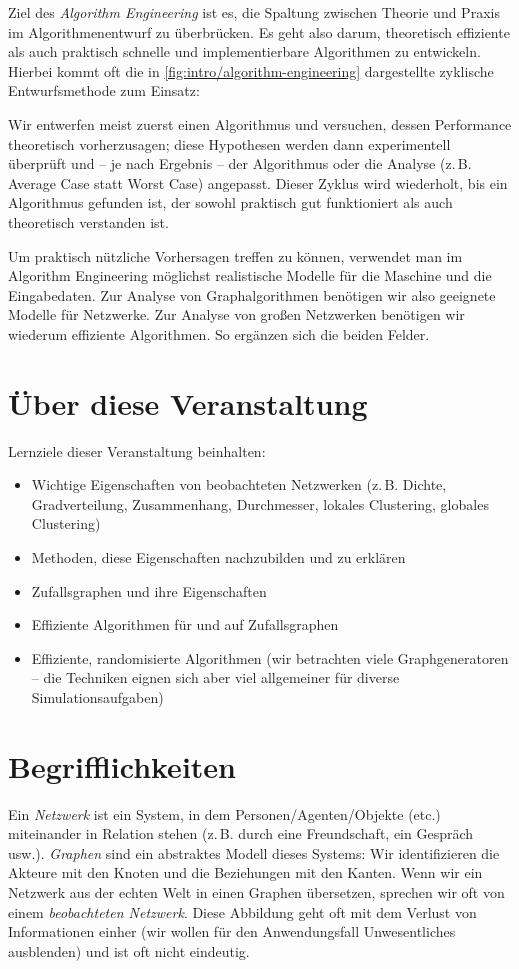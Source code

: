 Ziel des \emph{Algorithm Engineering} ist es, die Spaltung zwischen Theorie und Praxis im Algorithmenentwurf zu überbrücken.
Es geht also darum, theoretisch effiziente als auch praktisch schnelle und implementierbare Algorithmen zu entwickeln.
Hierbei kommt oft die in \cref{fig:intro/algorithm-engineering} dargestellte zyklische Entwurfsmethode zum Einsatz:

Wir entwerfen meist zuerst einen Algorithmus und versuchen, dessen Performance theoretisch vorherzusagen;
diese Hypothesen werden dann experimentell überprüft und -- je nach Ergebnis -- der Algorithmus oder die Analyse (z.\,B. Average Case statt Worst Case) angepasst.
Dieser Zyklus wird wiederholt, bis ein Algorithmus gefunden ist, der sowohl praktisch gut funktioniert als auch theoretisch verstanden ist.

Um praktisch nützliche Vorhersagen treffen zu können, verwendet man im Algorithm Engineering möglichst realistische Modelle für die Maschine und die Eingabedaten.
Zur Analyse von Graphalgorithmen benötigen wir also geeignete Modelle für Netzwerke.
Zur Analyse von großen Netzwerken benötigen wir wiederum effiziente Algorithmen.
So ergänzen sich die beiden Felder.

\section{Über diese Veranstaltung}
Lernziele dieser Veranstaltung beinhalten:
\begin{itemize}
    \item Wichtige Eigenschaften von beobachteten Netzwerken (z.\,B. Dichte, Gradverteilung, Zusammenhang, Durchmesser, lokales Clustering, globales Clustering)
    \item Methoden, diese Eigenschaften nachzubilden und zu erklären
    \item Zufallsgraphen und ihre Eigenschaften
    \item Effiziente Algorithmen für und auf Zufallsgraphen
    \item Effiziente, randomisierte Algorithmen (wir betrachten viele Graphgeneratoren -- die Techniken eignen sich aber viel allgemeiner für diverse Simulationsaufgaben)
\end{itemize}

\section{Begrifflichkeiten}
Ein \emph{Netzwerk} ist ein System, in dem Personen/Agenten/Objekte (etc.) miteinander in Relation stehen (z.\,B. durch eine Freundschaft, ein Gespräch usw.).
\emph{Graphen} sind ein abstraktes Modell dieses Systems: Wir identifizieren die Akteure mit den Knoten und die Beziehungen mit den Kanten.
Wenn wir ein Netzwerk aus der echten Welt in einen Graphen übersetzen, sprechen wir oft von einem \emph{beobachteten Netzwerk}.
Diese Abbildung geht oft mit dem Verlust von Informationen einher (wir wollen für den Anwendungsfall Unwesentliches ausblenden) und ist oft nicht eindeutig.

